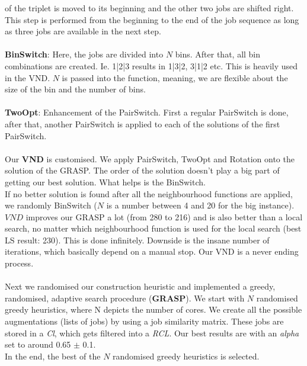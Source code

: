 \documentclass[12pt]{article}
\begin{document}
of the triplet is moved to its beginning and the other two jobs are shifted right.
This step is performed from the beginning to the end of the job sequence as long as
three jobs are available in the next step.
\\
\\
\textbf{BinSwitch}: Here, the jobs are divided into $N$ bins. After that, all bin combinations are created. Ie. 1|2|3 results in 1|3|2, 3|1|2 etc. This is heavily used in the VND. $N$ is passed into the function, meaning, we are flexible about the size of the bin and the number of bins.
\\
\\
\textbf{TwoOpt}: Enhancement of the PairSwitch. First a regular PairSwitch is done, after that, another PairSwitch is applied to each of the solutions of the first PairSwitch.
\\
\\
Our \textbf{VND} is customised. We apply PairSwitch, TwoOpt and Rotation onto the solution of the GRASP. The order of the solution doesn't play a big part of getting our best solution. What helps is the BinSwitch. 
\\
If no better solution is found after all the neighbourhood functions are applied, we randomly BinSwitch ($N$ is a number between 4 and 20 for the big instance). $VND$ improves our GRASP a lot (from 280 to 216) and is also better than a local search, no matter which neighbourhood function is used for the local search (best LS result: 230). This is done infinitely. Downside is the insane number of iterations, which basically depend on a manual stop. Our VND is a never ending process.
\\
\\
Next we randomised our construction heuristic and implemented a greedy, randomised, 
adaptive search procedure (\textbf{GRASP}). We start with $N$ randomised greedy heuristics, where N 
depicts the number of cores. We create all the possible augmentations (lists
of jobs) by using a job similarity matrix. These jobs are stored in a \textit{Cl}, which gets filtered into a \textit{RCL}. Our best results are with an \textit{alpha} set to around 0.65 $\pm$ 0.1.
\\
In the end, the best of the $N$ randomised greedy heuristics is selected.
\end{document}
